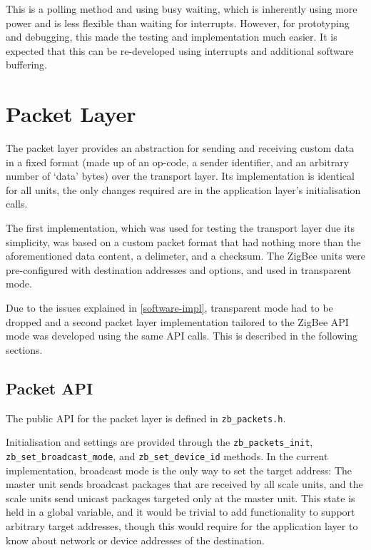 This is a polling method and using busy waiting, which is inherently using more power and is less flexible than waiting for interrupts. However, for prototyping and debugging, this made the testing and implementation much easier. It is expected that this can be re-developed using interrupts and additional software buffering. 

\section{Packet Layer}
The packet layer provides an abstraction for sending and receiving custom data in a fixed format (made up of an op-code, a sender identifier, and an arbitrary number of `data' bytes) over the transport layer. Its implementation is identical for all units, the only changes required are in the application layer's initialisation calls.

The first implementation, which was used for testing the transport layer due its simplicity, was based on a custom packet format that had nothing more than the aforementioned data content, a delimeter, and a checksum. The ZigBee units were pre-configured with destination addresses and options, and used in transparent mode.

Due to the issues explained in \ref{software-impl}, transparent mode had to be dropped and a second packet layer implementation tailored to the ZigBee API mode was developed using the same API calls. This is described in the following sections.

\subsection{Packet API}
The public API for the packet layer is defined in \texttt{zb\_packets.h}. 

Initialisation and settings are provided through the \texttt{zb\_packets\_init}, \texttt{zb\_set\_broadcast\_mode}, and \texttt{zb\_set\_device\_id} methods. In the current implementation, broadcast mode is the only way to set the target address: The master unit sends broadcast packages that are received by all scale units, and the scale units send unicast packages targeted only at the master unit. This state is held in a global variable, and it would be trivial to add functionality to support arbitrary target addresses, though this would require for the application layer to know about network or device addresses of the destination.


